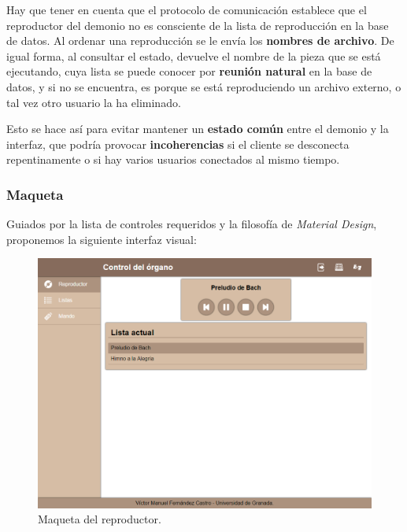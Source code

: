 Hay que tener en cuenta que el protocolo de comunicación establece que el reproductor del demonio no es consciente de la lista de reproducción en la base de datos. Al ordenar una reproducción se le envía los \textbf{nombres de archivo}. De igual forma, al consultar el estado, devuelve el nombre de la pieza que se está ejecutando, cuya lista se puede conocer por \textbf{reunión natural} en la base de datos, y si no se encuentra, es porque se está reproduciendo un archivo externo, o tal vez otro usuario la ha eliminado.

Esto se hace así para evitar mantener un \textbf{estado común} entre el demonio y la interfaz, que podría provocar \textbf{incoherencias} si el cliente se desconecta repentinamente o si hay varios usuarios conectados al mismo tiempo.

\subsubsection{Maqueta}

Guiados por la lista de controles requeridos y la filosofía de \textit{Material Design}, proponemos la siguiente interfaz visual:

\smallskip

\begin{figure}[H]
	\noindent \begin{centering}
		\includegraphics[width=\linewidth*3/4]{capitulo4/cap_reproductor}
		\par\end{centering}
	\smallskip
	\caption{\label{fig:cap_reproductor} Maqueta del reproductor.}
\end{figure} 

